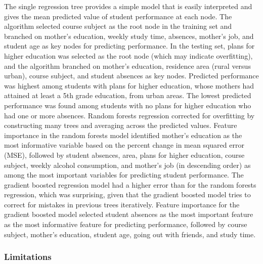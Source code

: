 \documentclass[sigconf]{acmart}
\begin{document}

The single regression tree provides a simple model that is easily interpreted 
and gives the mean predicted value of student performance at each node. The 
algorithm selected course subject as the root node in the training set and 
branched on mother's education, weekly study time, absences, mother's job, 
and student age as key nodes for predicting performance. In the testing set, 
plans for higher education was selected as the root node (which may indicate 
overfitting), and the algorithm branched on mother's education, residence area 
(rural versus urban), course subject, and student absences as key nodes. 
Predicted performance was highest among students with plans for higher 
education, whose mothers had attained at least a 5th grade education, from 
urban areas. The lowest predicted performance was found among students with 
no plans for higher education who had one or more absences. Random forests 
regression corrected for overfitting by constructing many trees and averaging 
across the predicted values. Feature importance in the random forests model 
identified mother's education as the most informative variable based on the 
percent change in mean squared error (MSE), followed by student absences, 
area, plans for higher education, course subject, weekly alcohol consumption, 
and mother's job (in descending order) as among the most important variables
for predicting student performance. The gradient boosted regression model 
had a higher error than for the random forests regression, which was surprising, 
given that the gradient boosted model tries to correct for mistakes in previous 
trees iteratively. Feature importance for the gradient boosted model selected 
student absences as the most important feature as the most informative feature
for predicting performance, followed by course subject, mother's education, 
student age, going out with friends, and study time.


\subsubsection{Limitations}
\end{document}
